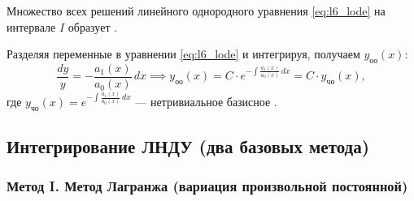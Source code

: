 \begin{corollary}
    Множество всех решений линейного однородного уравнения \eqref{eq:l6_lode}
    на интервале $I$ образует .
\end{corollary}

Разделяя переменные в уравнении \eqref{eq:l6_lode} и интегрируя, получаем
 $y_{\text{оо}}(x)$:
\begin{equation} \label{eq:l6_lode_sol}
    \frac{dy}{y} = -\frac{a_1(x)}{a_0(x)} \, dx \implies
    y_{\text{оо}}(x) = C \cdot e^{-\int \frac{a_1(x)}{a_0(x)} \, dx} =
    C \cdot y_{\text{чо}}(x), \tag{5}
\end{equation}
где $y_{\text{чо}}(x) = e^{-\int \frac{a_1(x)}{a_0(x)} \, dx}$ — нетривиальное
базисное .

\subsection{Интегрирование ЛНДУ (два базовых метода)}

\subsubsection{Метод I. Метод Лагранжа (вариация произвольной постоянной)}


